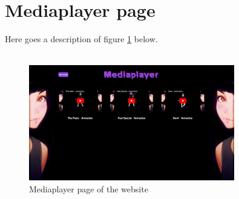 \section{Mediaplayer page}
Here goes a description of figure \ref{fig:mediaplayerpage} below.
\\
\\
\begin{figure}[htb]
    \centering
    \includegraphics[width=0.8\textwidth]{pics/Animotion_mediaplayer.png}
    \caption{Mediaplayer page of the website}
    \label{fig:mediaplayerpage}
\end{figure}
\\
\\
